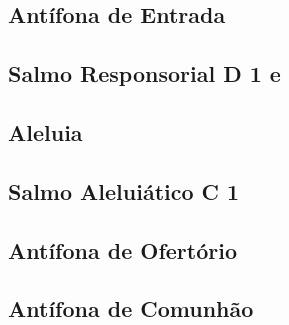 
\subsection{Antífona de Entrada}\label{subsection:tempus-adventus/missa-2/introitus}

\subsection[Salmo Responsorial]{Salmo Responsorial \textmd{D 1 e}}\label{subsection:tempus-adventus/missa-2/psalmus-responsorius}

\AllowPageFlush

\subsection{Aleluia}\label{subsection:tempus-adventus/missa-2/alleluia}

\AllowPageFlush

\subsection[Salmo Aleluiático]{Salmo Aleluiático \textmd{C 1}}\label{subsection:tempus-adventus/missa-2/psalmus-alleluiaticus}

\AllowPageFlush

\subsection{Antífona de Ofertório}\label{subsection:tempus-adventus/missa-2/offertorium}

\AllowPageFlush

\subsection{Antífona de Comunhão}\label{subsection:tempus-adventus/missa-2/communio}
